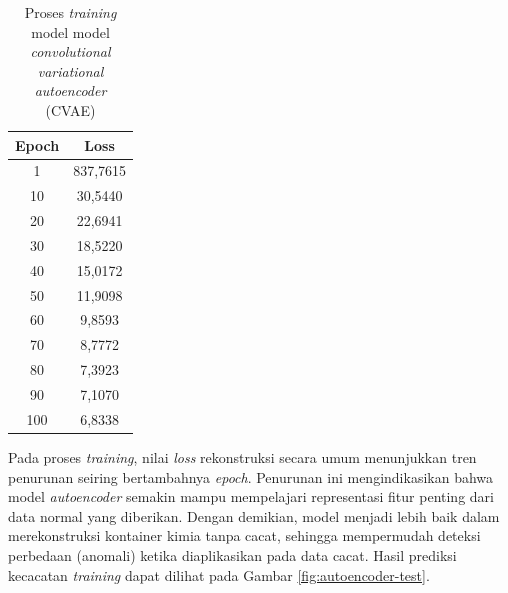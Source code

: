 \begin{table}[H]
  \caption{Proses \textit{training} model model \textit{convolutional
  variational autoencoder} (CVAE)}
  \label{tab:training-autoencoder}
  \vspace{-1em}
  \centering
  \begin{tabular}{cc}
    \toprule
    \textbf{Epoch} & \textbf{Loss} \\
    \midrule
    1 & 837,7615 \\
    10 & 30,5440 \\
    20 & 22,6941 \\
    30 & 18,5220 \\
    40 & 15,0172 \\
    50 & 11,9098 \\
    60 & 9,8593 \\
    70 & 8,7772 \\
    80 & 7,3923 \\
    90 & 7,1070 \\
    100 & 6,8338 \\
    \bottomrule
  \end{tabular}
\end{table}
Pada proses \textit{training}, nilai \textit{loss} rekonstruksi
secara umum menunjukkan tren penurunan seiring bertambahnya
\textit{epoch}. Penurunan ini mengindikasikan bahwa model \textit{autoencoder}
semakin mampu mempelajari representasi fitur penting dari data normal
yang diberikan. Dengan demikian, model menjadi lebih baik dalam
merekonstruksi kontainer kimia tanpa cacat, sehingga mempermudah
deteksi perbedaan (anomali) ketika diaplikasikan pada data cacat.
Hasil prediksi kecacatan \textit{training} dapat dilihat
pada Gambar \ref{fig:autoencoder-test}.

